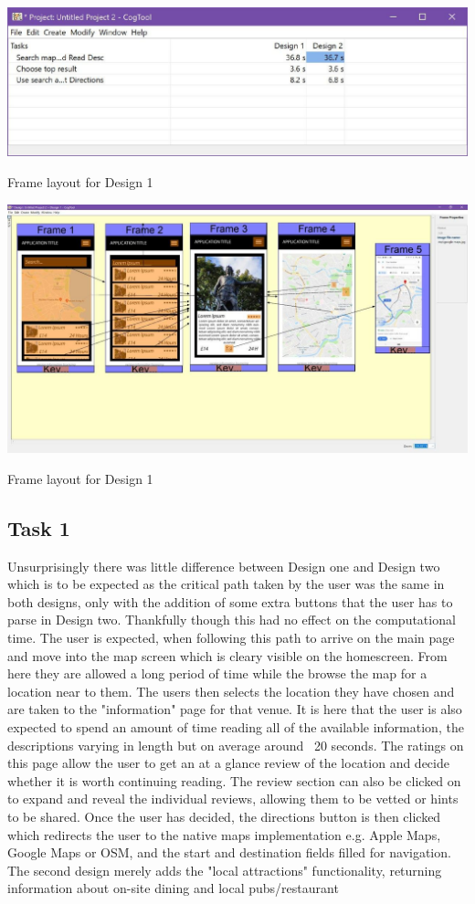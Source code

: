 \documentclass{article}
\begin{document}
\begin{table}[H]
\hspace{-2.5cm}
\includegraphics{images/cogtoolresults.jpg}
	\caption{Frame layout for Design 1}
\end{table}
\begin{table}[H]
\hspace{-2.5cm}
\includegraphics{images/cogtoolframes.jpg}
	\caption{Frame layout for Design 1}
\end{table}

\subsection{Task 1}
Unsurprisingly there was little difference between Design one and Design two which is to be expected as the critical path taken by the user was the same in both designs, only with the addition of some extra buttons that the user has to parse in Design two.
Thankfully though this had no effect on the computational time.
The user is expected, when following this path to arrive on the main page and move into the map screen which is cleary visible on the homescreen.
From here they are allowed a long period of time while the browse the map for a location near to them.
The users then selects the location they have chosen and are taken to the "information" page for that venue.
It is here that the user is also expected to spend an amount of time reading all of the available information, the descriptions varying in length but on average around ~20 seconds.
The ratings on this page allow the user to get an at a glance review of the location and decide whether it is worth continuing reading.
The review section can also be clicked on to expand and reveal the individual reviews, allowing them to be vetted or hints to be shared.
Once the user has decided, the directions button is then clicked which redirects the user to the native maps implementation e.g. Apple Maps, Google Maps or OSM, and the start and destination fields filled for navigation.
The second design merely adds the "local attractions" functionality, returning information about on-site dining and local pubs/restaurant
\end{document}

